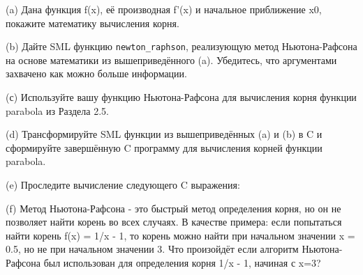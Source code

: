 (a) Дана функция f(x), её производная f'(x) и начальное приближение x0, покажите математику вычисления корня.

(b) Дайте SML функцию \lstinline|newton_raphson|, реализующую метод Ньютона-Рафсона на основе математики из вышеприведённого (a). Убедитесь, что аргументами захвачено как можно больше информации.

(с) Используйте вашу функцию Ньютона-Рафсона для вычисления корня функции parabola из Раздела 2.5.

(d) Трансформируйте SML функции из вышеприведённых (a) и (b) в C и сформируйте завершённую C программу для вычисления корней функции parabola.

(e) Проследите вычисление следующего C выражения:

(f) Метод Ньютона-Рафсона - это быстрый метод определения корня, но он не позволяет найти корень во всех случаях. В качестве примера: если попытаться найти корень f(x) = 1/x - 1, то корень можно найти при начальном значении x = 0.5, но не при начальном значении 3. Что произойдёт если алгоритм Ньютона-Рафсона был использован для определения корня 1/x - 1, начиная с x=3?

